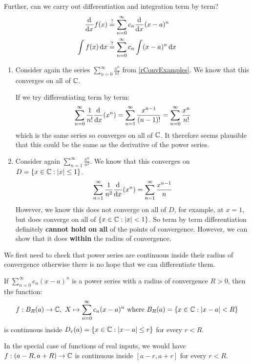 \documentclass[../main.tex]{subfiles}
\begin{document}
Further, can we carry out differentiation and integration term by term?
\begin{align*}
  \deriv{}{x}f(x) &\stackrel{?}= \sum_{n = 0}^{\infty} c_n \deriv{}{x}(x - a)^{n} \\
  \int f(x) \d{x} &\stackrel{?}= \sum_{n = 0}^{\infty} c_n \int (x - a)^{n} \d{x}
\end{align*}
\begin{example}[]
  \begin{enumerate}
    \item Consider again the series $\sum_{n = 0}^{\infty} \frac{x^{n}}{n!}$ from \cref{rConvExamples}.
      We know that this converges on all of $\mathbb{C}$.

      If we try differentiating term by term:
      \[
        \sum_{n = 0}^{\infty} \frac{1}{n!} \deriv{}{x}(x^{n}) = \sum_{n = 1}^{\infty} \frac{x^{n - 1}}{(n - 1)!} = \sum_{n = 0}^{\infty} \frac{x^{n}}{n!}
      \]
      which is the same series so converges on all of $\mathbb{C}$.
      It therefore seems plausible that this could be the same as the derivative of the power series.
    \item Consider again $\sum_{n = 1}^{\infty} \frac{x^{n}}{n^2}$.
      We know that this converges on $D = \{x \in \mathbb{C}: |x| \leq 1\}$.
      \[
        \sum_{n = 1}^{\infty} \frac{1}{n^2} \deriv{}{x}(x^{n}) = \sum_{n = 1}^{\infty} \frac{x^{n - 1}}{n}
      \]
      However, we know this does not converge on all of $D$, for example, at $x = 1$, but does converge on all of $\{x \in \mathbb{C} : |x| < 1\}$.
      So term by term differentiation definitely \textbf{cannot hold on all} of the points of convergence.
      However, we can show that it does \textbf{within} the radius of convergence.
  \end{enumerate}
\end{example}
We first need to check that power series are continuous inside their radius of convergence otherwise there is no hope that we can differentiate them.
\begin{proposition}
  If $\sum_{n = 0}^{\infty} c_n(x - a)^{n}$ is a power series with a radius of convergence $R > 0$, then the function: \label{powerSeriesCty}
  \[
    f: B_R(a) \to \mathbb{C},\ X \mapsto \sum_{n = 0}^{\infty} c_n(x - a)^{n} \text{ where } B_R(a) = \{x \in \mathbb{C}: |x - a| < R\}
  \]
  is continuous inside $D_r(a) = \{x \in \mathbb{C}: |x - a| \leq r\}$ for every $r < R$.
\end{proposition}
\begin{remark}
  In the special case of functions of real inputs, we would have $f: (a - R, a + R) \to \mathbb{C}$ is continuous inside $[a - r,  a + r]$ for every $r < R$.
\end{remark}
\end{document}

